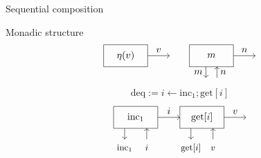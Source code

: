 \documentclass[aspectratio=54]{beamer}
\newcommand{\kw}[1]{\ensuremath{ \mathrm{#1} }}
\begin{document}
\begin{frame}[fragile]{Sequential composition}
\begin{block}{Monadic structure}
\[    %
    \begin{tikzpicture}[scale=0.4,baseline=0]
      \draw (-2,-1) rectangle (2,1);
      \draw[->] (2,0) -- node[above] {$v$} (4,0);
      \node (L) at (0,0) {$\eta(v)$};
    \end{tikzpicture}
    \qquad
    \begin{tikzpicture}[scale=0.4,baseline=0]
      \draw (-2,-1) rectangle (2,1);
      \draw[->] (2,0) -- node[above] {$n$} (4,0);
      \node (L) at (0,0) {$m$};
      \draw[->] (-0.5, -1) -- node[left]  {$m$} (-0.5, -2);
      \draw[->] ( 0.5, -2) -- node[right] {$n$} ( 0.5, -1);
    \end{tikzpicture}
  \]
\end{block}

\begin{example}
  \[
    \kw{deq} :=
      i \leftarrow \kw{inc}_1 \mathrel{;} \kw{get}[i]
  \]
  \[
    \begin{tikzpicture}[scale=0.4]
      \begin{scope}[xshift=-6cm]
        \draw (-2,-1) rectangle (2,1);
        \node (L) at (0,0) {$\kw{inc}_1$};
        \draw[->] (-1, -1) -- (-1, -2);
        \node[anchor=base] at (-1,-3) {\small $\kw{inc_1}$};
        \draw[->] (1, -2) -- (1, -1);
        \node[anchor=base] at (1,-3) {\small $i$};
        \draw[->] (2,0) -- node[above] {$i$} (4,0);
      \end{scope}
      \begin{scope}
        \draw (-2,-1) rectangle (2,1);
        \node (L) at (0,0) {$\kw{get}[i]$};
        \draw[->] (-1, -1) -- (-1, -2);
        \node[anchor=base] at (-1, -3) {\small $\kw{get}[i]$};
        \draw[->] (1, -2) -- (1, -1);
        \node[anchor=base] at (1, -3) {\small $v$};
        \draw[->] (2,0) -- node[above] {$v$} (4,0);
      \end{scope}
    \end{tikzpicture}%
  \]
\end{example}
\end{frame}
\end{document}
